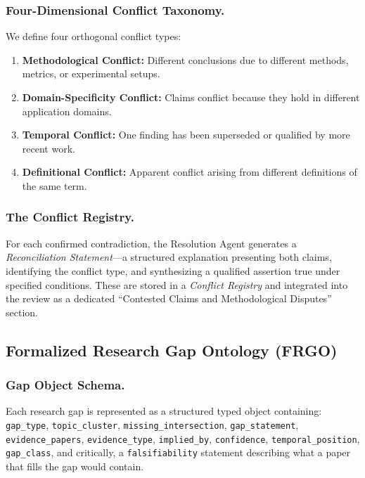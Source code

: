 \subsubsection{Four-Dimensional Conflict Taxonomy.}
We define four orthogonal conflict types:

\begin{enumerate}
    \item \textbf{Methodological Conflict:} Different conclusions due to different methods, metrics, or experimental setups.
    \item \textbf{Domain-Specificity Conflict:} Claims conflict because they hold in different application domains.
    \item \textbf{Temporal Conflict:} One finding has been superseded or qualified by more recent work.
    \item \textbf{Definitional Conflict:} Apparent conflict arising from different definitions of the same term.
\end{enumerate}

\subsubsection{The Conflict Registry.}
For each confirmed contradiction, the Resolution Agent generates a \emph{Reconciliation Statement}---a structured explanation presenting both claims, identifying the conflict type, and synthesizing a qualified assertion true under specified conditions. These are stored in a \emph{Conflict Registry} and integrated into the review as a dedicated ``Contested Claims and Methodological Disputes'' section.

\subsection{Formalized Research Gap Ontology (FRGO)}

\subsubsection{Gap Object Schema.}
Each research gap is represented as a structured typed object containing: \texttt{gap\_type}, \texttt{topic\_cluster}, \texttt{missing\_intersection}, \texttt{gap\_statement}, \texttt{evidence\_papers}, \texttt{evidence\_type}, \texttt{implied\_by}, \texttt{confidence}, \texttt{temporal\_position}, \texttt{gap\_class}, and critically, a \texttt{falsifiability} statement describing what a paper that fills the gap would contain.

